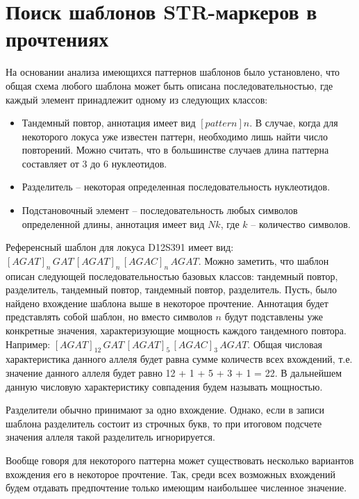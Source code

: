 \section{Поиск шаблонов STR-маркеров в прочтениях}

На основании анализа имеющихся паттернов шаблонов было установлено, что общая схема
любого шаблона может быть описана последовательностью, где каждый элемент принадлежит одному из следующих классов:
\begin{itemize}
\item Тандемный повтор, аннотация имеет вид $[pattern]n$.
В случае, когда для некоторого локуса уже известен паттерн, необходимо лишь найти число повторений.
Можно считать, что в большинстве случаев длина паттерна составляет от 3 до 6 нуклеотидов.

\item Разделитель -- некоторая определенная последовательность нуклеотидов.

\item Подстановочный элемент -- последовательность любых символов определенной длины,
аннотация имеет вид $Nk$, где $k$ -- количество символов.
\end{itemize}

\begin{Example}
Референсный шаблон для локуса D12S391 имеет вид: $[AGAT]_{n} \, GAT \, [AGAT]_{n} \, [AGAC]_{n} \, AGAT$.
Можно заметить, что шаблон описан следующей последовательностью базовых классов:
тандемный повтор, разделитель, тандемный повтор, тандемный повтор, разделитель.
Пусть, было найдено вхождение шаблона выше в некоторое прочтение.
Аннотация будет представлять собой шаблон, но вместо символов $n$ будут подставлены уже
конкретные значения, характеризующие мощность каждого тандемного повтора. Например:
$[AGAT]_{12} \, GAT \, [AGAT]_{5} \, [AGAC]_{3} \, AGAT$.
Общая числовая характеристика данного аллеля будет равна сумме количеств всех вхождений, т.е.
значение данного аллеля будет равно 12 + 1 + 5 + 3 + 1 = 22.
В дальнейшем данную числовую характеристику совпадения будем называть мощностью.
\end{Example}

\begin{Remark}
Разделители обычно принимают за одно вхождение. Однако, если в записи шаблона разделитель
состоит из строчных букв, то при итоговом подсчете значения аллеля такой разделитель игнорируется.
\end{Remark}

\begin{Remark}
Вообще говоря для некоторого паттерна может существовать несколько вариантов вхождения его в некоторое
прочтение. Так, среди всех возможных вхождений будем отдавать предпочтение только имеющим
наибольшее численное значение.
\end{Remark}

